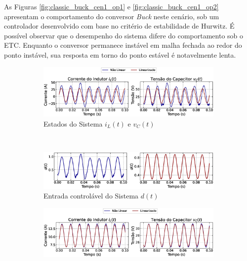 As Figuras \ref{fig:classic_buck_cen1_op1} e \ref{fig:classic_buck_cen1_op2} apresentam o comportamento do conversor \textit{Buck} neste cenário, sob um controlador desenvolvido com base no critério de estabilidade de Hurwitz. É possível observar que o desempenho do sistema difere do comportamento sob o ETC. Enquanto o conversor permanece instável em malha fechada ao redor do ponto instável, sua resposta em torno do ponto estável é notavelmente lenta.

\begin{figure}[H]
  \centering
  \captionsetup{justification=centering}
  \begin{subfigure}{1.\textwidth}
    \centering
    \includegraphics[width=1.\textwidth]{figuras/classic/buck/sim1/op1/result.eps}
    \caption{Estados do Sistema $i_L(t)$  e $v_C(t)$}
  \end{subfigure}
  \\[6pt]
  \begin{subfigure}{1.\textwidth}
    \centering
    \includegraphics[width=1.\textwidth]{figuras/classic/buck/sim1/op1/duty-cycle.eps}
    \caption{Entrada controlável do Sistema $d(t)$}
  \end{subfigure}
  \caption{Conversor \textit{Buck} no Cenário 1 operando em torno de $P_{\mathrm{o}, 1}$ sob controlador projetado utilizando o critério de estabilidade de Hurwitz.}
  \label{fig:classic_buck_cen1_op1}
  \begin{subfigure}{1.\textwidth}
    \centering
    \includegraphics[width=1.\textwidth]{figuras/classic/buck/sim1/op2/result.eps}

\end{subfigure}
\end{figure}
